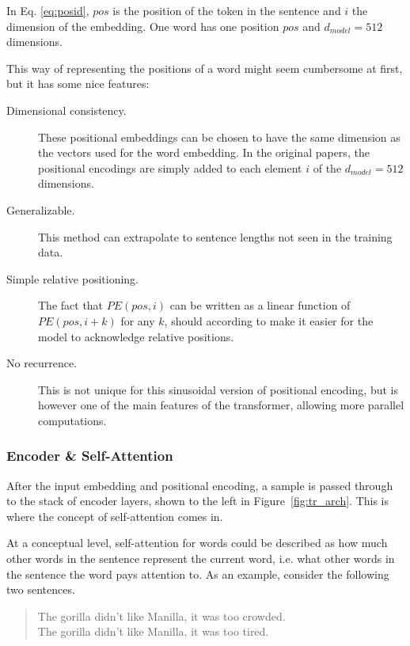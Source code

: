 In Eq. \ref{eq:posid}, $pos$ is the position of the token in the sentence and $i$ the dimension of the embedding. One word has one position $pos$ and $d_{model} = 512$ dimensions.

This way of representing the positions of a word might seem cumbersome at first, but it has some nice features: 

\begin{description}
    \item[Dimensional consistency.] These positional embeddings can be chosen to have the same dimension as the vectors used for the word embedding. In the original papers, the positional encodings are simply added to each element $i$ of the $d_{model} = 512$ dimensions. 
    \item[Generalizable.] This method can extrapolate to sentence lengths not seen in the training data. 
    \item[Simple relative positioning.] The fact that $PE(pos, i)$ can be written as a linear function of $PE(pos, i + k)$ for any $k$, should according to \citet{NIPS2017_7181} make it easier for the model to acknowledge relative positions. 
    \item[No recurrence.] This is not unique for this sinusoidal version of positional encoding, but is however one of the main features of the transformer, allowing more parallel computations. 
\end{description}

\subsubsection{Encoder \& Self-Attention}

After the input embedding and positional encoding, a sample is passed through to the stack of encoder layers, shown to the left in Figure~\ref{fig:tr_arch}. This is where the concept of self-attention comes in. 

At a conceptual level, self-attention for words could be described as how much other words in the sentence represent the current word, i.e. what other words in the sentence the word pays attention to. As an example, consider the following two sentences. 

\begin{quote}
The gorilla didn't like Manilla, it was too crowded.\\
The gorilla didn't like Manilla, it was too tired.
\end{quote}

